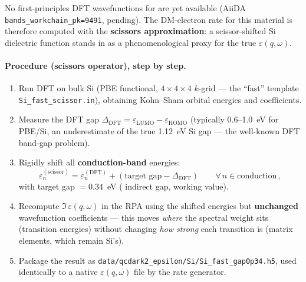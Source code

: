 No first-principles DFT wavefunctions for \SrCdSb{} are yet available
(AiiDA \texttt{bands\_workchain\_pk=9491}, pending). The DM-electron rate
for this material is therefore computed with the \textbf{scissors
approximation}: a scissor-shifted Si dielectric function stands in as a
phenomenological proxy for the true \SrCdSb{} $\varepsilon(q,\omega)$.

\paragraph{Procedure (scissors operator), step by step.}
\begin{enumerate}[leftmargin=*]
  \item Run DFT on bulk Si (PBE functional, $4\times4\times4$ $k$-grid — the
        ``fast'' template \texttt{Si\_fast\_scissor.in}), obtaining
        Kohn--Sham orbital energies and coefficients.
  \item Measure the DFT gap $\Delta_\mathrm{DFT} = \varepsilon_\mathrm{LUMO}
        - \varepsilon_\mathrm{HOMO}$ (typically 0.6--1.0~eV for PBE/Si, an
        underestimate of the true 1.12~eV Si gap — the well-known DFT
        band-gap problem).
  \item Rigidly shift all \textbf{conduction-band} energies:
  \begin{equation}
  \varepsilon_n^{(\mathrm{scissor})} = \varepsilon_n^{(\mathrm{DFT})} +
  (\text{target gap} - \Delta_\mathrm{DFT}) \qquad \forall\, n \in \text{conduction}\,,
  \end{equation}
  with target gap $=0.34$~eV (\SrCdSb{} indirect gap, working value).
  \item Recompute $\Im\,\varepsilon(q,\omega)$ in the RPA using the shifted
        energies but \textbf{unchanged} wavefunction coefficients — this
        moves \emph{where} the spectral weight sits (transition energies)
        without changing \emph{how strong} each transition is (matrix
        elements, which remain Si's).
  \item Package the result as \texttt{data/qcdark2\_epsilon/Si/Si\_fast\_gap0p34.h5},
        used identically to a native \SrCdSb{} $\varepsilon(q,\omega)$ file
        by the rate generator.
\end{enumerate}

